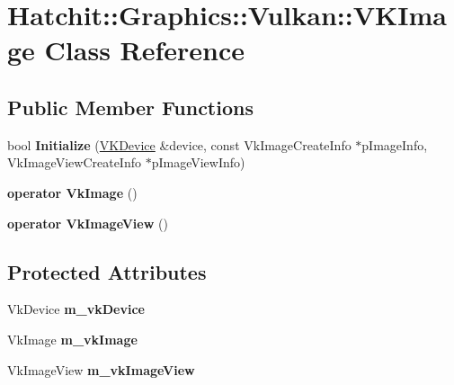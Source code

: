 \hypertarget{classHatchit_1_1Graphics_1_1Vulkan_1_1VKImage}{}\section{Hatchit\+:\+:Graphics\+:\+:Vulkan\+:\+:V\+K\+Image Class Reference}
\label{classHatchit_1_1Graphics_1_1Vulkan_1_1VKImage}
\subsection*{Public Member Functions}
\begin{DoxyCompactItemize}
\item 
bool {\bfseries Initialize} (\hyperlink{classHatchit_1_1Graphics_1_1Vulkan_1_1VKDevice}{V\+K\+Device} \&device, const Vk\+Image\+Create\+Info $\ast$p\+Image\+Info, Vk\+Image\+View\+Create\+Info $\ast$p\+Image\+View\+Info)\hypertarget{classHatchit_1_1Graphics_1_1Vulkan_1_1VKImage_a576f7d3450d84f29b22cbe9c01991b98}{}\label{classHatchit_1_1Graphics_1_1Vulkan_1_1VKImage_a576f7d3450d84f29b22cbe9c01991b98}

\item 
{\bfseries operator Vk\+Image} ()\hypertarget{classHatchit_1_1Graphics_1_1Vulkan_1_1VKImage_a8d588dfab0e266058d76ba2005894724}{}\label{classHatchit_1_1Graphics_1_1Vulkan_1_1VKImage_a8d588dfab0e266058d76ba2005894724}

\item 
{\bfseries operator Vk\+Image\+View} ()\hypertarget{classHatchit_1_1Graphics_1_1Vulkan_1_1VKImage_af57998b441743fe3410e06d83ce60051}{}\label{classHatchit_1_1Graphics_1_1Vulkan_1_1VKImage_af57998b441743fe3410e06d83ce60051}

\end{DoxyCompactItemize}
\subsection*{Protected Attributes}
\begin{DoxyCompactItemize}
\item 
Vk\+Device {\bfseries m\+\_\+vk\+Device}\hypertarget{classHatchit_1_1Graphics_1_1Vulkan_1_1VKImage_a1a2a10baf85547f2149035e02412d9bd}{}\label{classHatchit_1_1Graphics_1_1Vulkan_1_1VKImage_a1a2a10baf85547f2149035e02412d9bd}

\item 
Vk\+Image {\bfseries m\+\_\+vk\+Image}\hypertarget{classHatchit_1_1Graphics_1_1Vulkan_1_1VKImage_af7541be93e7a2dafac3079426b789108}{}\label{classHatchit_1_1Graphics_1_1Vulkan_1_1VKImage_af7541be93e7a2dafac3079426b789108}

\item 
Vk\+Image\+View {\bfseries m\+\_\+vk\+Image\+View}\hypertarget{classHatchit_1_1Graphics_1_1Vulkan_1_1VKImage_a96662af9312a08b4a727d8a8e657dd94}{}\label{classHatchit_1_1Graphics_1_1Vulkan_1_1VKImage_a96662af9312a08b4a727d8a8e657dd94}

\end{DoxyCompactItemize}


